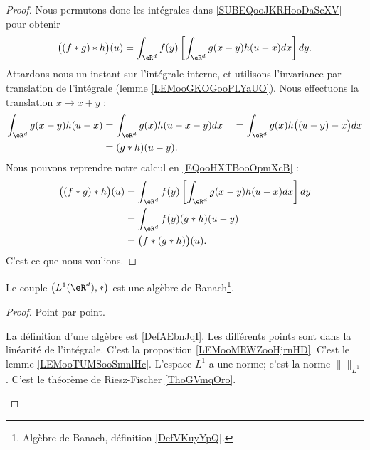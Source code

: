 \begin{proof}
	Nous permutons donc les intégrales dans \eqref{SUBEQooJKRHooDaScXV} pour obtenir
	\begin{equation}        \label{EQooHXTBooOpmXcB}
		\big( (f*g)*h \big)(u)=\int_{\eR^d}f(y)\left[ \int_{\eR^d}g(x-y)h(u-x)dx \right]dy.
	\end{equation}
	Attardons-nous un instant sur l'intégrale interne, et utilisons l'invariance par translation de l'intégrale (lemme \ref{LEMooGKOGooPLYaUO}). Nous effectuons la translation \( x\to x+y\) :
	\begin{subequations}
		\begin{align}
			\int_{\eR^d}g(x-y)h(u-x) & =\int_{\eR^d}g(x)h(u-x-y)dx\
			                         & =\int_{\eR^d}g(x)h\big( (u-y)-x \big)dx \\
			                         & =(g*h)(u-y).
		\end{align}
	\end{subequations}
	Nous pouvons reprendre notre calcul en \eqref{EQooHXTBooOpmXcB} :
	\begin{subequations}
		\begin{align}
			\big( (f*g)*h \big)(u) & =\int_{\eR^d}f(y)\left[ \int_{\eR^d}g(x-y)h(u-x)dx \right]dy \\
			                       & =\int_{\eR^d}f(y)(g*h)(u-y)                                  \\
			                       & =\big( f*(g*h) \big)(u).
		\end{align}
	\end{subequations}
	C'est ce que nous voulions.
\end{proof}

\begin{proposition}     \label{PROPooNBHNooInwoar}
	Le couple \( \big( L^1(\eR^d), * \big)\) est une algèbre de Banach\footnote{Algèbre de Banach, définition \ref{DefVKuyYpQ}.}.
\end{proposition}

\begin{proof}
	Point par point.
	\begin{subproof}
		\spitem[algèbre]
		La définition d'une algèbre est \ref{DefAEbnJqI}. Les différents points sont dans la linéarité de l'intégrale.
		\spitem[Commutative]
		C'est la proposition \ref{LEMooMRWZooHjrnHD}.
		\spitem[Associative]
		C'est le lemme \ref{LEMooTUMSooSmnlHc}.
		\spitem[Normé]
		L'espace \( L^1\) a une norme; c'est la norme \( \|  \|_{L^1}\).
		\spitem[Complet]
		C'est le théorème de Riesz-Fischer \ref{ThoGVmqOro}.
	\end{subproof}
\end{proof}

